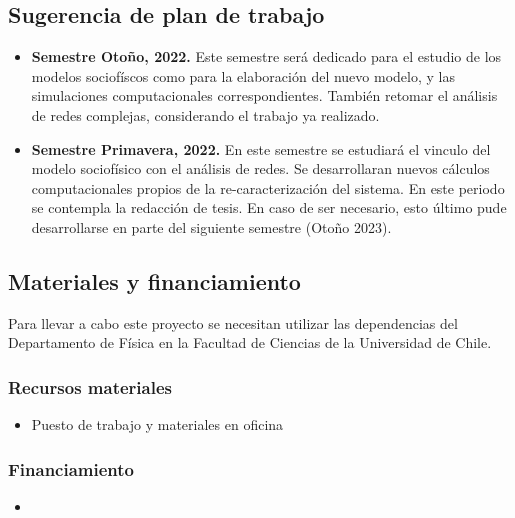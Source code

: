 \documentclass{proyectotesis}
\begin{document}
\subsection{Sugerencia de plan de trabajo}
\begin{itemize}
\item \textbf{Semestre Otoño, 2022.} Este semestre será dedicado para el estudio de los modelos sociofíscos como para la elaboración del nuevo modelo, y las simulaciones computacionales correspondientes. También retomar el análisis de redes complejas, considerando el trabajo ya realizado.

\item \textbf{Semestre Primavera, 2022.} En este semestre se estudiará el vinculo del modelo sociofísico con el análisis de redes. Se desarrollaran nuevos cálculos computacionales propios de la re-caracterización del sistema. En este periodo se contempla la redacción de tesis. En caso de ser necesario, esto último pude desarrollarse en parte del siguiente semestre (Otoño 2023). 
\end{itemize}

\subsection{Materiales y financiamiento}

Para llevar a cabo este proyecto se necesitan utilizar las dependencias del Departamento de Física en la Facultad de Ciencias de la Universidad de Chile. %

\subsubsection*{Recursos materiales}

\begin{itemize}
\item Puesto de trabajo y materiales en oficina

\nocite{*}
\end{itemize}
\subsubsection*{Financiamiento}
\begin{itemize}
\item
\end{itemize}

%
%
\end{document}
